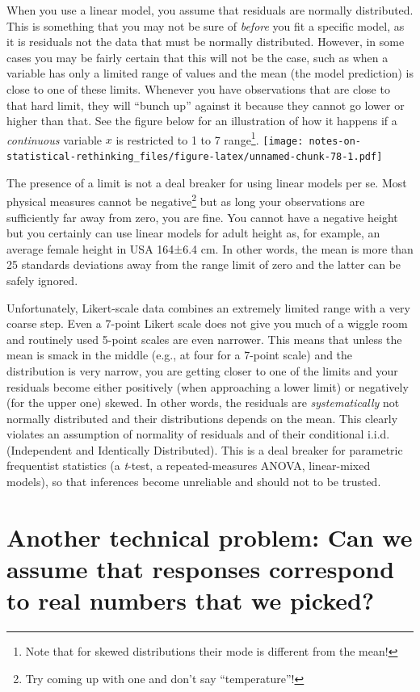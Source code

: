 \documentclass[
]{book}
\begin{document}
When you use a linear model, you assume that residuals are normally distributed. This is something that you may not be sure of \emph{before} you fit a specific model, as it is residuals not the data that must be normally distributed. However, in some cases you may be fairly certain that this will not be the case, such as when a variable has only a limited range of values and the mean (the model prediction) is close to one of these limits. Whenever you have observations that are close to that hard limit, they will ``bunch up'' against it because they cannot go lower or higher than that. See the figure below for an illustration of how it happens if a \emph{continuous} variable \(x\) is restricted to 1 to 7 range\footnote{Note that for skewed distributions their mode is different from the mean!}.
\texttt{[image: notes-on-statistical-rethinking\_files/figure-latex/unnamed-chunk-78-1.pdf]}

The presence of a limit is not a deal breaker for using linear models per se. Most physical measures cannot be negative\footnote{Try coming up with one and don't say ``temperature''!} but as long your observations are sufficiently far away from zero, you are fine. You cannot have a negative height but you certainly can use linear models for adult height as, for example, an average female height in USA 164±6.4 cm. In other words, the mean is more than 25 standards deviations away from the range limit of zero and the latter can be safely ignored.

Unfortunately, Likert-scale data combines an extremely limited range with a very coarse step. Even a 7-point Likert scale does not give you much of a wiggle room and routinely used 5-point scales are even narrower. This means that unless the mean is smack in the middle (e.g., at four for a 7-point scale) and the distribution is very narrow, you are getting closer to one of the limits and your residuals become either positively (when approaching a lower limit) or negatively (for the upper one) skewed. In other words, the residuals are \emph{systematically} not normally distributed and their distributions depends on the mean. This clearly violates an assumption of normality of residuals and of their conditional i.i.d. (Independent and Identically Distributed). This is a deal breaker for parametric frequentist statistics (a \emph{t}-test, a repeated-measures ANOVA, linear-mixed models), so that inferences become unreliable and should not to be trusted.

\hypertarget{another-technical-problem-can-we-assume-that-responses-correspond-to-real-numbers-that-we-picked}{%
\section{Another technical problem: Can we assume that responses correspond to real numbers that we picked?}\label{another-technical-problem-can-we-assume-that-responses-correspond-to-real-numbers-that-we-picked}}
\end{document}
